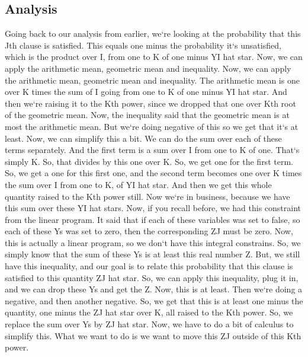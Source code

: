 \subsection{Analysis}
Going back to our analysis from earlier, we`re looking at the probability that this Jth clause is satisfied.
This equals one minus the probability it`s unsatisfied, which is the product over I, from one to K of one minus YI hat star.
Now, we can apply the arithmetic mean, geometric mean and inequality.
Now, we can apply the arithmetic mean, geometric mean and inequality.
The arithmetic mean is one over K times the sum of I going from one to K of one minus YI hat star.
And then we`re raising it to the Kth power, since we dropped that one over Kth root of the geometric mean.
Now, the inequality said that the geometric mean is at most the arithmetic mean.
But we`re doing negative of this so we get that it`s at least.
Now, we can simplify this a bit.
We can do the sum over each of these terms separately.
And the first term is a sum over I from one to K of one.
That`s simply K\@.
So, that divides by this one over K\@.
So, we get one for the first term.
So, we get a one for this first one, and the second term becomes one over K times the sum over I from one to K, of YI hat star.
And then we get this whole quantity raised to the Kth power still.
Now we`re in business, because we have this sum over these YI hat stars.
Now, if you recall before, we had this constraint from the linear program.
It said that if each of these variables was set to false, so each of these Ys was set to zero, then the corresponding ZJ must be zero.
Now, this is actually a linear program, so we don`t have this integral constrains.
So, we simply know that the sum of these Ys is at least this real number Z\@.
But, we still have this inequality, and our goal is to relate this probability that this clause is satisfied to this quantity ZJ hat star.
So, we can apply this inequality, plug it in, and we can drop these Ys and get the Z\@.
Now, this is at least.
Then we`re doing a negative, and then another negative.
So, we get that this is at least one minus the quantity, one minus the ZJ hat star over K, all raised to the Kth power.
So, we replace the sum over Ys by ZJ hat star.
Now, we have to do a bit of calculus to simplify this.
What we want to do is we want to move this ZJ outside of this Kth power.

